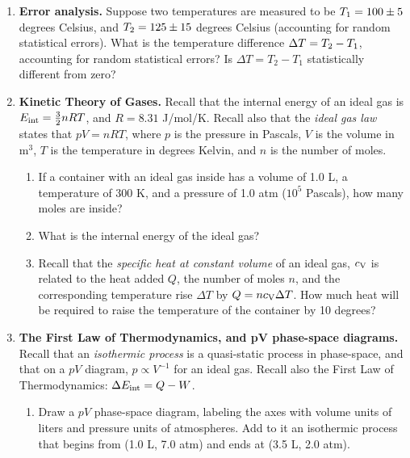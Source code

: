 \documentclass[10pt]{article}
\begin{document}
\begin{enumerate}
\begin{enumerate}
\end{enumerate}
\item \textbf{Error analysis.}  Suppose two temperatures are measured to be $T_{\rm 1} = 100 \pm 5$ degrees Celsius, and $T_{\rm 2} = 125 \pm 15$ degrees Celsius (accounting for random statistical errors).  What is the temperature difference $\Delta T = T_{\rm 2} - T_{\rm 1}$, accounting for random statistical errors?  Is $\Delta T = T_2 - T_1$ statistically different from zero? \\ \vspace{2cm}
\item \textbf{Kinetic Theory of Gases.} Recall that the internal energy of an ideal gas is $E_{\rm int} = \frac{3}{2}n R T$, and $R = 8.31$ J/mol/K.  Recall also that the \textit{ideal gas law} states that $pV = n R T$, where $p$ is the pressure in Pascals, $V$ is the volume in m$^3$, $T$ is the temperature in degrees Kelvin, and $n$ is the number of moles.
\begin{enumerate}
\item If a container with an ideal gas inside has a volume of 1.0 L, a temperature of 300 K, and a pressure of 1.0 atm ($10^5$ Pascals), how many moles are inside? \\ \vspace{2cm}
\item What is the internal energy of the ideal gas? \\ \vspace{2cm}
\item Recall that the \textit{specific heat at constant volume} of an ideal gas, $c_{\rm V}$ is related to the heat added $Q$, the number of moles $n$, and the corresponding temperature rise $\Delta T$ by $Q = n c_{\rm V} \Delta T$.  How much heat will be required to raise the temperature of the container by 10 degrees? \\ \vspace{2cm}
\end{enumerate}
\item \textbf{The First Law of Thermodynamics, and pV phase-space diagrams.}  Recall that an \textit{isothermic process} is a quasi-static process in phase-space, and that on a $pV$ diagram, $p \propto V^{-1}$ for an ideal gas.  Recall also the First Law of Thermodynamics: $\Delta E_{\rm int} = Q - W$.
\begin{enumerate}
\item Draw a $pV$ phase-space diagram, labeling the axes with volume units of liters and pressure units of atmospheres.  Add to it an isothermic process that begins from (1.0 L, 7.0 atm) and ends at (3.5 L, 2.0 atm). \\ \vspace{3cm}

\end{enumerate}
\end{enumerate}
\end{document}
